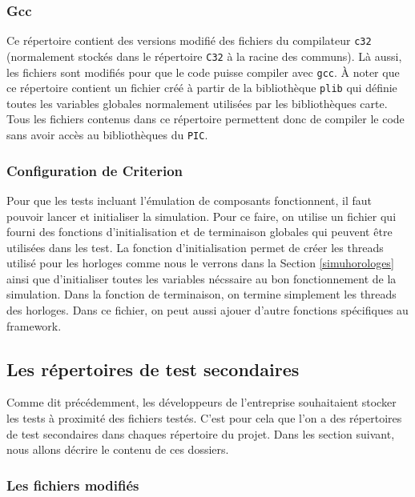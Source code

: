\documentclass[a4paper]{article}
\begin{document}
\subsubsection*{Gcc}
\label{gcc}

Ce répertoire contient des versions modifié des fichiers du compilateur
\verb|c32| (normalement stockés dans le répertoire \verb|C32| à la racine des
communs). Là aussi, les fichiers sont modifiés pour que le code puisse compiler
avec \verb|gcc|. À noter que ce répertoire contient un fichier créé à partir de
la bibliothèque \verb|plib| qui définie toutes les variables globales
normalement utilisées par les bibliothèques carte. Tous les fichiers contenus
dans ce répertoire permettent donc de compiler le code sans avoir accès au
bibliothèques du \verb|PIC|.

\subsubsection*{Configuration de Criterion}
\label{configuration-de-criterion}

Pour que les tests incluant l'émulation de composants fonctionnent, il faut
pouvoir lancer et initialiser la simulation. Pour ce faire, on utilise un
fichier qui fourni des fonctions d'initialisation et de terminaison globales qui
peuvent être utilisées dans les test. La fonction d'initialisation permet de
créer les threads utilisé pour les horloges comme nous le verrons dans la
Section \ref{simuhorologes} ainsi que d'initialiser toutes les variables
nécssaire au bon fonctionnement de la simulation. Dans la fonction de
terminaison, on termine simplement les threads des horloges. Dans ce fichier, on
peut aussi ajouer d'autre fonctions spécifiques au framework.

\subsection{Les répertoires de test secondaires}

Comme dit précédemment, les développeurs de l'entreprise souhaitaient stocker
les tests à proximité des fichiers testés. C'est pour cela que l'on a des
répertoires de test secondaires dans chaques répertoire du projet. Dans les
section suivant, nous allons décrire le contenu de ces dossiers.

\subsubsection{Les fichiers modifiés}
\end{document}
